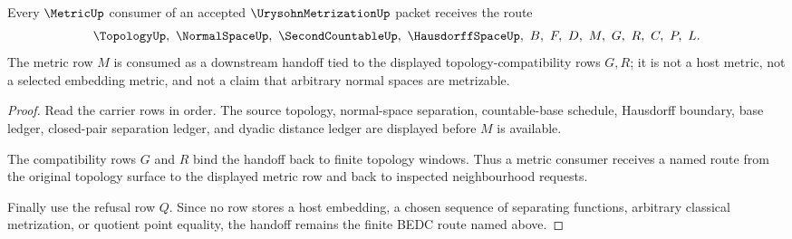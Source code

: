 \begin{theorem}
\label{thm:urysohn-metrization-metric-handoff}
Every $\MetricUp$ consumer of an accepted $\UrysohnMetrizationUp$ packet receives the route
$$
\TopologyUp,\ \NormalSpaceUp,\ \SecondCountableUp,\ \HausdorffSpaceUp,\ B,\ F,\ D,\ M,\ G,\ R,\ C,\ P,\ L.
$$
The metric row $M$ is consumed as a downstream handoff tied to the displayed topology-compatibility rows $G,R$; it is not a host metric, not a selected embedding metric, and not a claim that arbitrary normal spaces are metrizable.
\end{theorem}
\begin{proof}
Read the carrier rows in order. The source topology, normal-space separation, countable-base schedule, Hausdorff boundary, base ledger, closed-pair separation ledger, and dyadic distance ledger are displayed before $M$ is available.

The compatibility rows $G$ and $R$ bind the handoff back to finite topology windows. Thus a metric consumer receives a named route from the original topology surface to the displayed metric row and back to inspected neighbourhood requests.

Finally use the refusal row $Q$. Since no row stores a host embedding, a chosen sequence of separating functions, arbitrary classical metrization, or quotient point equality, the handoff remains the finite BEDC route named above.
\end{proof}


\begin{closurestatus}{\UrysohnMetrizationUp}
  \theoryclosure{\seedClosure}
  \formalstatus{\unformalizedV}
\end{closurestatus}
